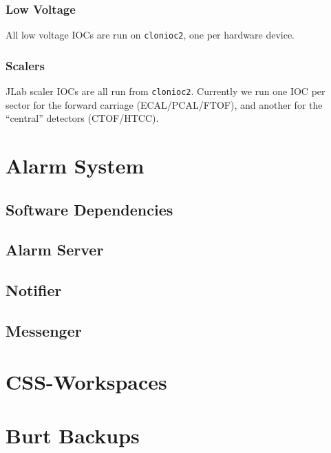\documentclass[amsmath,amssymb,notitlepage,11pt]{revtex4}
\begin{document}
\subsubsection{Low Voltage}
All low voltage IOCs are run on \texttt{clonioc2}, one per hardware device.
\subsubsection{Scalers}
JLab scaler IOCs are all run from \texttt{clonioc2}.  Currently we run one IOC per sector for the forward carriage (ECAL/PCAL/FTOF), and another for the ``central'' detectors (CTOF/HTCC).



\section{Alarm System}
\subsection{Software Dependencies}
\subsection{Alarm Server}
\subsection{Notifier}
\subsection{Messenger}

\section{CSS-Workspaces}

\section{Burt Backups}



%
\end{document}
